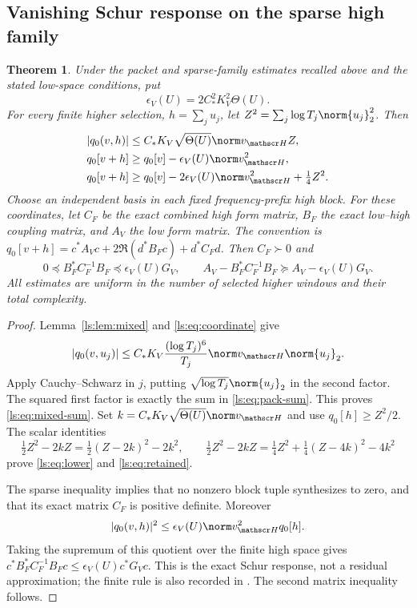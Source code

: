 \documentclass[11pt,a4paper]{article}
\numberwithin{equation}{section}
\newtheorem{theorem}{Theorem}[section]
\theoremstyle{definition}\newtheorem{definition}[theorem]{Definition}
\theoremstyle{remark}\newtheorem{remark}[theorem]{Remark}
\begin{document}
\subsection{Vanishing Schur response on the sparse high family}

\begin{theorem}\label{ls:thm:main}
Under the packet and sparse-family estimates recalled above and the stated low-space conditions, put
\[
 \epsilon_V(U)=2C_*^2K_V^2\Theta(U).
\]
For every finite higher selection, $h=\sum_j u_j$, let
$Z^2=\sum_j\log T_j\norm{u_j}_2^2$. Then
\begin{align}
 |q_0(v,h)|&\le C_*K_V\sqrt{\Theta(U)}\norm v_{\mathscr H}Z,\label{ls:eq:mixed-sum}\\
 q_0[v+h]&\ge q_0[v]-\epsilon_V(U)\norm v_{\mathscr H}^2,\label{ls:eq:lower}\\
 q_0[v+h]&\ge q_0[v]-2\epsilon_V(U)\norm v_{\mathscr H}^2
                         +\tfrac14Z^2.\label{ls:eq:retained}
\end{align}
Choose an independent basis in each fixed frequency-prefix high block.
For these coordinates, let $C_F$ be the exact combined
high form matrix, $B_F$ the exact low--high coupling matrix, and $A_V$ the
low form matrix. The convention is
$q_0[v+h]=c^*A_Vc+2\Re(d^*B_Fc)+d^*C_Fd$.
Then $C_F\succ0$ and
\begin{equation}\label{ls:eq:response}
 \boxed{0\preceq B_F^*C_F^{-1}B_F
          \preceq\epsilon_V(U)G_V,\qquad
 A_V-B_F^*C_F^{-1}B_F\succeq A_V-\epsilon_V(U)G_V.}
\end{equation}
All estimates are uniform in the number of selected higher windows and
their total complexity.
\end{theorem}
\begin{proof}
Lemma~\ref{ls:lem:mixed} and \eqref{ls:eq:coordinate} give
\[
 |q_0(v,u_j)|\le C_*K_V\frac{(\log T_j)^6}{T_j}
                         \norm v_{\mathscr H}\norm{u_j}_2.
\]
Apply Cauchy--Schwarz in $j$, putting $\sqrt{\log T_j}\norm{u_j}_2$
in the second factor. The squared first factor is exactly the sum in
\eqref{ls:eq:pack-sum}. This proves \eqref{ls:eq:mixed-sum}.
Set $k=C_*K_V\sqrt{\Theta(U)}\norm v_{\mathscr H}$ and use
$q_0[h]\ge Z^2/2$. The scalar identities
\[
 \tfrac12 Z^2-2kZ=\tfrac12(Z-2k)^2-2k^2,\qquad
 \tfrac12 Z^2-2kZ=\tfrac14Z^2+\tfrac14(Z-4k)^2-4k^2
\]
prove \eqref{ls:eq:lower} and \eqref{ls:eq:retained}.

The sparse inequality implies that no nonzero block tuple synthesizes to
zero, and that its exact matrix $C_F$ is positive definite. Moreover
\[
 |q_0(v,h)|^2\le\epsilon_V(U)\norm v_{\mathscr H}^2q_0[h].
\]
Taking the supremum of this quotient over the finite high space gives
$c^*B_F^*C_F^{-1}B_Fc\le\epsilon_V(U)c^*G_Vc$. This is the exact Schur
response, not a residual approximation; the finite rule is also recorded
in \cite[Appendix A.5]{Boyd}. The second matrix inequality follows.
\end{proof}
\end{document}

